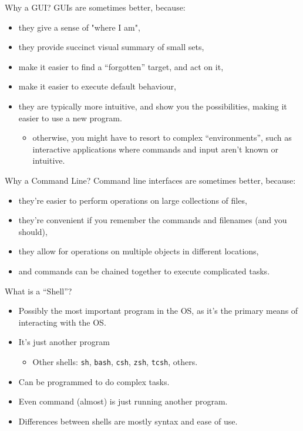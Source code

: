 \documentclass[graphics]{beamer}
\begin{document}
\begin{frame}{Why a GUI?}
    GUIs are sometimes better, because:
    \begin{itemize}
        \item they give a sense of "where I am",
        \item they provide succinct visual summary of small sets,
        \item make it easier to find a ``forgotten'' target, and act on it,
        \item make it easier to execute default behaviour,
        \item they are typically more intuitive, and show you the possibilities, making it easier to use a new program.
        \begin{itemize}
            \item otherwise, you might have to resort to complex ``environments'', such as interactive applications where commands and input aren't known or intuitive.
        \end{itemize}
    \end{itemize}
\end{frame}

\begin{frame}{Why a Command Line?}
    Command line interfaces are sometimes better, because:
    \begin{itemize}
        \item they're easier to perform operations on large collections of files,
        \item they're convenient if you remember the commands and filenames (and you should),
        \item they allow for operations on multiple objects in different locations,
        \item and commands can be chained together to execute complicated tasks.
    \end{itemize}
\end{frame}

\begin{frame}{What is a ``Shell''?}
    \begin{itemize}
        \item Possibly the most important program in the OS, as it's the primary means of interacting with the OS.
        \item It's just another program
        \begin{itemize}
            \item Other shells: \texttt{sh}, \texttt{bash}, \texttt{csh}, \texttt{zsh}, \texttt{tcsh}, others.
        \end{itemize}
        \item Can be programmed to do complex tasks.
        \item Even command (almost) is just running another program.
        \item Differences between shells are mostly syntax and ease of use.
    \end{itemize}
\end{frame}
\end{document}
